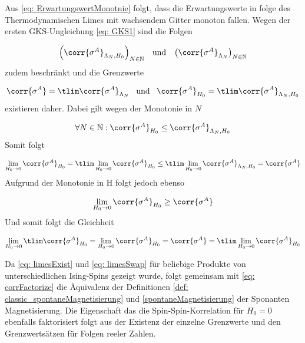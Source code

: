 \noindent Aus \eqref{eq: ErwartungswertMonotnie} folgt, dass die Erwartungswerte in folge des Thermodynamischen Limes mit wachsendem Gitter monoton fallen. Wegen der ersten GKS-Ungleichung \eqref{eq: GKS1} sind die Folgen 

\begin{equation}\left(\corr{\sigma^A}_{\Lambda_N,H_0}\right)_{N\in\mathbb N} \;\;\;\text{und}\;\;\;  \left( \corr{\sigma^A}_{\Lambda_N}\right)_{N\in\mathbb N} \end{equation} zudem beschränkt und die Grenzwerte 

\begin{equation} \corr{\sigma^A} = \tlim \corr{\sigma^A}_{\Lambda_N} \;\;\;\text{und}\;\;\; \corr{\sigma^A}_{H_0} = \tlim \corr{\sigma^A}_{\Lambda_N,H_0} \label{eq: limesExist}
\end{equation} existieren daher. Dabei gilt wegen der Monotonie in $N$

\begin{equation} 
\forall N\in\mathbb{N}: \corr{\sigma^A}_{H_0} \leq  \corr{\sigma^A}_{\Lambda_N,H_0}
\end{equation} Somit folgt 

\begin{equation} 
\lim_{H_0 \rightarrow 0} \corr{\sigma^A}_{H_0} = \tlim \lim_{H_0 \rightarrow 0}  \corr{\sigma^A}_{H_0} \leq \tlim \lim_{H_0 \rightarrow 0}  \corr{\sigma^A}_{\Lambda_N,H_0} = \corr{\sigma^A}
\end{equation} Aufgrund der Monotonie in H folgt jedoch ebenso 

\begin{equation} 
\lim_{H_0 \rightarrow 0} \corr{\sigma^A}_{H_0} \geq \corr{\sigma^A}
\end{equation} Und somit folgt die Gleichheit 

\begin{equation} 
\lim_{H_0 \rightarrow 0} \tlim \corr{\sigma^A}_{H_0} = \lim_{H_0 \rightarrow 0} \corr{\sigma^A}_{H_0} =  \corr{\sigma^A} = \tlim \lim_{H_0 \rightarrow 0}  \corr{\sigma^A}_{H_0} \label{eq: limesSwap}
\end{equation} 

\noindent Da \eqref{eq: limesExist} und \eqref{eq: limesSwap} für beliebige Produkte von unterschiedlichen Ising-Spins gezeigt wurde, folgt gemeinsam mit \eqref{eq: corrFactorize} die Äquivalenz der Definitionen \eqref{def: classic_spontaneMagnetisierung} und \eqref{spontaneMagnetisierung} der Sponanten Magnetisierung. Die Eigenschaft das die Spin-Spin-Korrelation für $H_0 = 0$ ebenfalls faktorisiert folgt aus der Existenz der einzelne Grenzwerte und den Grenzwertsätzen für Folgen reeler Zahlen.  

